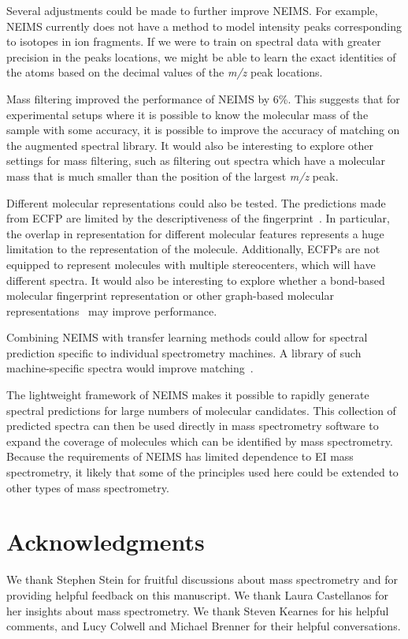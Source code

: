 Several adjustments could be made to further improve NEIMS. For example, NEIMS currently does not have a method to model intensity peaks corresponding to isotopes in ion fragments. If we were to train on spectral data with greater precision in the peaks locations, we might be able to learn the exact identities of the atoms based on the decimal values of the \textit{m/z} peak locations.

Mass filtering improved the performance of NEIMS by 6\%. This suggests that for experimental setups where it is possible to know the molecular mass of the sample with some accuracy, it is possible to improve the accuracy of matching on the augmented spectral library. It would also be interesting to explore other settings for mass filtering, such as filtering out spectra which have a molecular mass that is much smaller than the position of the largest \textit{m/z} peak.

Different molecular representations could also be tested. The predictions made from ECFP are limited by the descriptiveness of the fingerprint~\cite{rdkit_blogpost_collide_bits}. In particular, the overlap in representation for different molecular features represents a huge limitation to the representation of the molecule. Additionally, ECFPs are not equipped to represent molecules with multiple stereocenters, which will have different spectra. It would also be interesting to explore whether a bond-based molecular fingerprint representation \cite{kearnes2016molecular} or other graph-based molecular representations~\cite{duvenaud_convolutional_2015, gilmer_2017_mpnn} may improve performance.

Combining NEIMS with transfer learning methods could allow for spectral prediction specific to individual spectrometry machines. A library of such machine-specific spectra would improve matching~\cite{stein2012MassLibReview}.

The lightweight framework of NEIMS makes it possible to rapidly generate spectral predictions for large numbers of molecular candidates. This collection of predicted spectra can then be used directly in mass spectrometry software to expand the coverage of molecules which can be identified by mass spectrometry. Because the requirements of NEIMS has limited dependence to EI mass spectrometry, it likely that some of the principles used here could be extended to other types of mass spectrometry.


\section{Acknowledgments}
We thank Stephen Stein for fruitful discussions about mass spectrometry and for providing helpful feedback on this manuscript. We thank Laura Castellanos for her insights about mass spectrometry. We thank Steven Kearnes for his helpful comments, and Lucy Colwell and Michael Brenner for their helpful conversations.
